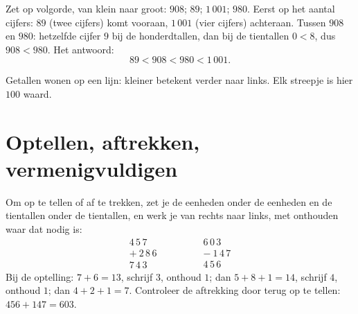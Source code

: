 \begin{example}\label{ex:g6:wholes:order}
Zet op volgorde, van klein naar groot: $908$; $89$; $1\,001$; $980$. Eerst op
het aantal cijfers: $89$ (twee cijfers) komt vooraan, $1\,001$ (vier cijfers)
achteraan. Tussen $908$ en $980$: hetzelfde cijfer $9$ bij de honderdtallen,
dan bij de tientallen $0 < 8$, dus $908 < 980$. Het antwoord:
\[
89 < 908 < 980 < 1\,001 .
\]
\end{example}

\begin{omfigure}

{\small Getallen wonen op een lijn: kleiner betekent verder naar links. Elk
streepje is hier $100$ waard.}
\end{omfigure}

\section{Optellen, aftrekken, vermenigvuldigen}

\begin{example}[Cijferen]\label{ex:g6:wholes:columns}
Om op te tellen of af te trekken, zet je de eenheden onder de eenheden en de
tientallen onder de tientallen, en werk je van rechts naar links, met
onthouden waar dat nodig is:
\[
\begin{array}{r}
4\,5\,7 \\
+\ 2\,8\,6 \\
\hline
7\,4\,3
\end{array}
\qquad\qquad
\begin{array}{r}
6\,0\,3 \\
-\ 1\,4\,7 \\
\hline
4\,5\,6
\end{array}
\]
Bij de optelling: $7 + 6 = 13$, schrijf $3$, onthoud $1$; dan
$5 + 8 + 1 = 14$, schrijf $4$, onthoud $1$; dan $4 + 2 + 1 = 7$. Controleer de
aftrekking door terug op te tellen: $456 + 147 = 603$.
\end{example}

